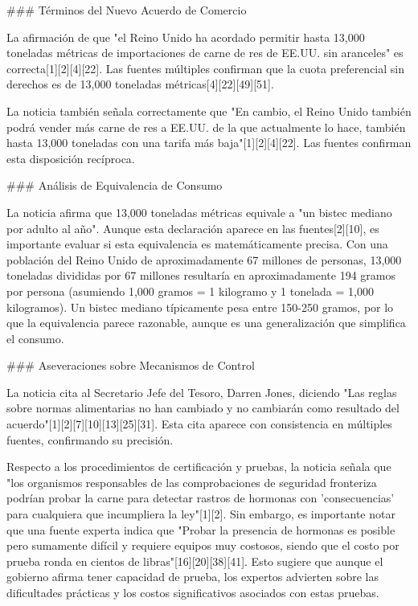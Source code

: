 \documentclass[10pt,a4paper]{article}
\begin{document}
\par\medskip
\#\#\# T\'{e}rminos del Nuevo Acuerdo de Comercio
\par\medskip
La afirmaci\'{o}n de que "el Reino Unido ha acordado permitir hasta 13,000 toneladas m\'{e}tricas de importaciones de carne de res de EE.UU. sin aranceles" es correcta[1][2][4][22]. Las fuentes m\'{u}ltiples confirman que la cuota preferencial sin derechos es de 13,000 toneladas m\'{e}tricas[4][22][49][51].
\par\medskip
La noticia tambi\'{e}n se\~{n}ala correctamente que "En cambio, el Reino Unido tambi\'{e}n podr\'{a} vender m\'{a}s carne de res a EE.UU. de la que actualmente lo hace, tambi\'{e}n hasta 13,000 toneladas con una tarifa m\'{a}s baja"[1][2][4][22]. Las fuentes confirman esta disposici\'{o}n rec\'{i}proca.
\par\medskip
\#\#\# An\'{a}lisis de Equivalencia de Consumo
\par\medskip
La noticia afirma que 13,000 toneladas m\'{e}tricas equivale a "un bistec mediano por adulto al a\~{n}o". Aunque esta declaraci\'{o}n aparece en las fuentes[2][10], es importante evaluar si esta equivalencia es matem\'{a}ticamente precisa. Con una poblaci\'{o}n del Reino Unido de aproximadamente 67 millones de personas, 13,000 toneladas divididas por 67 millones resultar\'{i}a en aproximadamente 194 gramos por persona (asumiendo 1,000 gramos = 1 kilogramo y 1 tonelada = 1,000 kilogramos). Un bistec mediano t\'{i}picamente pesa entre 150-250 gramos, por lo que la equivalencia parece razonable, aunque es una generalizaci\'{o}n que simplifica el consumo.
\par\medskip
\#\#\# Aseveraciones sobre Mecanismos de Control
\par\medskip
La noticia cita al Secretario Jefe del Tesoro, Darren Jones, diciendo "Las reglas sobre normas alimentarias no han cambiado y no cambiar\'{a}n como resultado del acuerdo"[1][2][7][10][13][25][31]. Esta cita aparece con consistencia en m\'{u}ltiples fuentes, confirmando su precisi\'{o}n.
\par\medskip
Respecto a los procedimientos de certificaci\'{o}n y pruebas, la noticia se\~{n}ala que "los organismos responsables de las comprobaciones de seguridad fronteriza podr\'{i}an probar la carne para detectar rastros de hormonas con 'consecuencias' para cualquiera que incumpliera la ley"[1][2]. Sin embargo, es importante notar que una fuente experta indica que "Probar la presencia de hormonas es posible pero sumamente dif\'{i}cil y requiere equipos muy costosos, siendo que el costo por prueba ronda en cientos de libras"[16][20][38][41]. Esto sugiere que aunque el gobierno afirma tener capacidad de prueba, los expertos advierten sobre las dificultades pr\'{a}cticas y los costos significativos asociados con estas pruebas.
\end{document}
